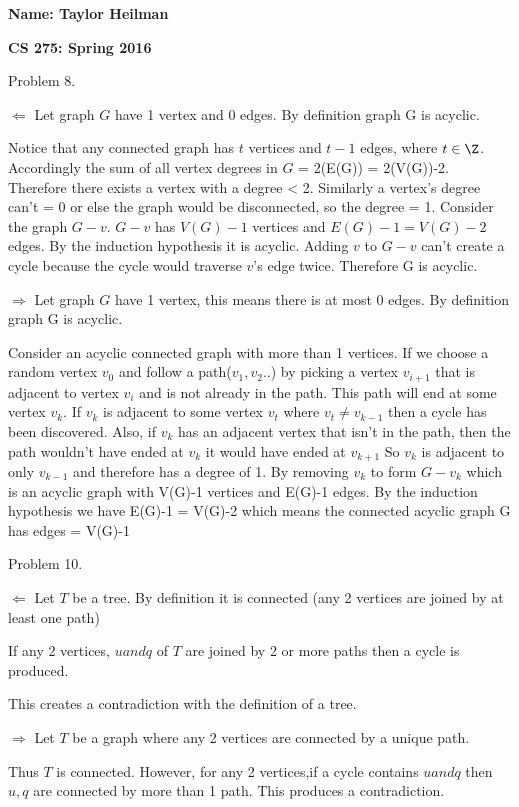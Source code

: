 \documentclass[12pt]{article}
\begin{document}
\textbf{Name: Taylor Heilman}    \hspace{4in} 
\begin{center} \textbf{CS 275: Spring 2016} \end{center}


{Problem 8.

$\Leftarrow$  Let graph $G$ have 1 vertex and 0 edges.  By definition graph G is acyclic. 

Notice that any connected graph has $t$ vertices and $t-1$ edges, where $t \in \Z$.  Accordingly the sum of all vertex degrees in $G$ = 2(E(G)) = 2(V(G))-2. Therefore there exists a vertex with a degree < 2.  Similarly a vertex's degree can't = 0 or else the graph would be disconnected, so the degree = 1. Consider the graph $G-v$.  $G-v$ has $V(G)-1$ vertices and $E(G)-1 = V(G)-2$ edges.  By the induction hypothesis it is acyclic. Adding $v$ to $G-v$ can't create a cycle because the cycle would traverse $v$'s edge twice. Therefore G is acyclic.


$\Rightarrow$ Let graph $G$ have 1 vertex, this means there is at most 0 edges.  By definition graph G is acyclic. 

Consider an acyclic connected graph with more than 1 vertices.  If we choose a random vertex $v_0$ and follow a path($v_1,v_2$..) by picking a vertex $v_{i+1}$ that is adjacent to vertex $v_i$ and is not already in the path. This path will end at some vertex $v_k$. If $v_k$ is adjacent to some vertex $v_t$ where $v_t \neq v_{k-1}$ then a cycle has been discovered. Also, if $v_k$ has an adjacent vertex that isn't in the path, then the path wouldn't have ended at $v_k$ it would have ended at $v_{k+1}$ So $v_k$ is adjacent to only $v_{k-1}$ and therefore has a degree of 1.  By removing $v_k$ to form $G-v_k$ which is an acyclic graph with V(G)-1 vertices and E(G)-1 edges.  By the induction hypothesis we have E(G)-1 = V(G)-2 which means the connected acyclic graph G has edges = V(G)-1


}



{Problem 10.

$\Leftarrow$ Let $T$ be a tree. By definition it is connected (any 2 vertices are joined by at least one path)

If any 2 vertices, $u and q$ of $T$ are joined by 2 or more paths then a cycle is produced.

This creates a contradiction with the definition of a tree.

$\Rightarrow$ Let $T$ be a graph where any 2 vertices are connected by a unique path.

Thus $T$ is connected. However, for any 2 vertices,if a cycle contains $u and q$ then $u,q$ are connected by more than 1 path.  This produces a contradiction.





}
\end{document}
